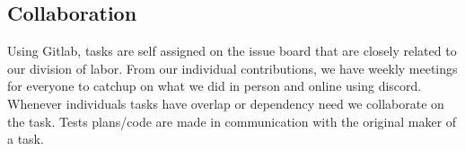 \subsection{Collaboration}
Using Gitlab, tasks are self assigned on the issue board that are closely related to our division of labor. From our individual
contributions, we have weekly meetings for everyone to catchup on what we did in person and online using discord. Whenever individuals
tasks have overlap or dependency need we collaborate on the task. Tests plans/code are made in communication with the original maker of a task.

